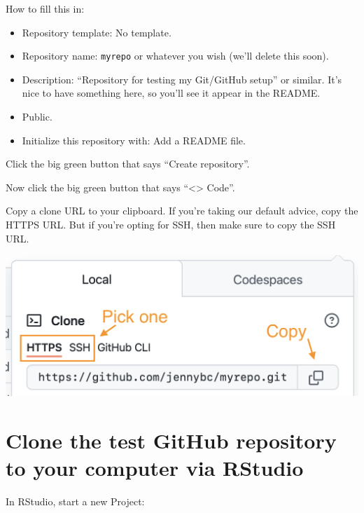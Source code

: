 \documentclass[
]{book}
\providecommand{\tightlist}{%
  \setlength{\itemsep}{0pt}\setlength{\parskip}{0pt}}
\begin{document}
How to fill this in:

\begin{itemize}
\tightlist
\item
  Repository template: No template.
\item
  Repository name: \texttt{myrepo} or whatever you wish (we'll delete this soon).
\item
  Description: ``Repository for testing my Git/GitHub setup'' or similar. It's nice to have something here, so you'll see it appear in the README.
\item
  Public.
\item
  Initialize this repository with: Add a README file.
\end{itemize}

Click the big green button that says ``Create repository''.

Now click the big green button that says ``\textless\textgreater{} Code''.

Copy a clone URL to your clipboard.
If you're taking our default advice, copy the HTTPS URL.
But if you're opting for SSH, then make sure to copy the SSH URL.

\begin{center}\includegraphics[width=0.6\linewidth]{img/github-https-or-ssh-url-annotated} \end{center}

\section{Clone the test GitHub repository to your computer via RStudio}\label{clone-the-test-github-repository-to-your-computer-via-rstudio}

In RStudio, start a new Project:
\end{document}
